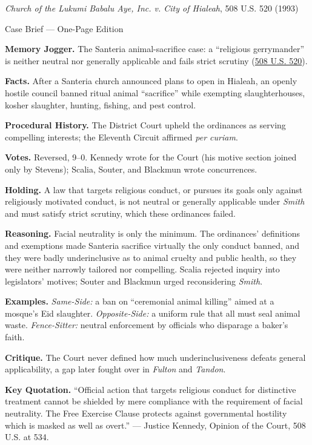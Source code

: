 \documentclass[12pt]{article}
\begin{document}
\begin{center}
{\Large \textit{Church of the Lukumi Babalu Aye, Inc. v. City of Hialeah}, 508 U.S. 520 (1993)\par}
\vspace{0.3em}
{\normalsize Case Brief --- One-Page Edition\par}
\end{center}

\textbf{Memory Jogger.} The Santeria animal-sacrifice case: a ``religious gerrymander'' is neither neutral nor generally applicable and fails strict scrutiny (\href{https://supreme.justia.com/cases/federal/us/508/520/}{508 U.S. 520}).

\textbf{Facts.} After a Santeria church announced plans to open in Hialeah, an openly hostile council banned ritual animal ``sacrifice'' while exempting slaughterhouses, kosher slaughter, hunting, fishing, and pest control.

\textbf{Procedural History.} The District Court upheld the ordinances as serving compelling interests; the Eleventh Circuit affirmed \textit{per curiam}.

\textbf{Votes.} Reversed, 9--0. Kennedy wrote for the Court (his motive section joined only by Stevens); Scalia, Souter, and Blackmun wrote concurrences.

\textbf{Holding.} A law that targets religious conduct, or pursues its goals only against religiously motivated conduct, is not neutral or generally applicable under \textit{Smith} and must satisfy strict scrutiny, which these ordinances failed.

\textbf{Reasoning.} Facial neutrality is only the minimum. The ordinances' definitions and exemptions made Santeria sacrifice virtually the only conduct banned, and they were badly underinclusive as to animal cruelty and public health, so they were neither narrowly tailored nor compelling. Scalia rejected inquiry into legislators' motives; Souter and Blackmun urged reconsidering \textit{Smith}.

\textbf{Examples.} \emph{Same-Side:} a ban on ``ceremonial animal killing'' aimed at a mosque's Eid slaughter. \emph{Opposite-Side:} a uniform rule that all must seal animal waste. \emph{Fence-Sitter:} neutral enforcement by officials who disparage a baker's faith.

\textbf{Critique.} The Court never defined how much underinclusiveness defeats general applicability, a gap later fought over in \textit{Fulton} and \textit{Tandon}.

\textbf{Key Quotation.} ``Official action that targets religious conduct for distinctive treatment cannot be shielded by mere compliance with the requirement of facial neutrality. The Free Exercise Clause protects against governmental hostility which is masked as well as overt.'' --- Justice Kennedy, Opinion of the Court, 508 U.S. at 534.
\end{document}
